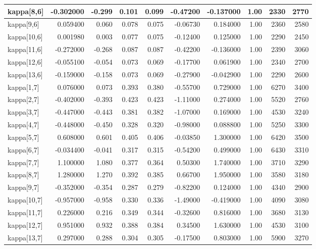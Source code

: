 \documentclass[
]{article}
\begin{document}
\begin{longtable*}[t]{l|r|r|r|r|r|r|r|r|r}
\hline
kappa[8,6] & -0.302000 & -0.299 & 0.101 & 0.099 & -0.47200 & -0.137000 & 1.00 & 2330 & 2770\\
\hline
kappa[9,6] & 0.059400 & 0.060 & 0.078 & 0.075 & -0.06730 & 0.184000 & 1.00 & 2360 & 2580\\
\hline
kappa[10,6] & 0.001980 & 0.003 & 0.077 & 0.075 & -0.12400 & 0.125000 & 1.00 & 2290 & 2450\\
\hline
kappa[11,6] & -0.272000 & -0.268 & 0.087 & 0.087 & -0.42200 & -0.136000 & 1.00 & 2390 & 3060\\
\hline
kappa[12,6] & -0.055100 & -0.054 & 0.073 & 0.069 & -0.17700 & 0.061900 & 1.00 & 2340 & 2700\\
\hline
kappa[13,6] & -0.159000 & -0.158 & 0.073 & 0.069 & -0.27900 & -0.042900 & 1.00 & 2290 & 2600\\
\hline
kappa[1,7] & 0.076000 & 0.073 & 0.393 & 0.380 & -0.55700 & 0.729000 & 1.00 & 6270 & 3400\\
\hline
kappa[2,7] & -0.402000 & -0.393 & 0.423 & 0.423 & -1.11000 & 0.274000 & 1.00 & 5520 & 2760\\
\hline
kappa[3,7] & -0.447000 & -0.443 & 0.381 & 0.382 & -1.07000 & 0.169000 & 1.00 & 4530 & 3240\\
\hline
kappa[4,7] & -0.448000 & -0.450 & 0.328 & 0.320 & -0.98000 & 0.088800 & 1.00 & 5250 & 3300\\
\hline
kappa[5,7] & 0.608000 & 0.601 & 0.405 & 0.406 & -0.03850 & 1.300000 & 1.00 & 6420 & 3500\\
\hline
kappa[6,7] & -0.034400 & -0.041 & 0.317 & 0.315 & -0.54200 & 0.499000 & 1.00 & 6430 & 3310\\
\hline
kappa[7,7] & 1.100000 & 1.080 & 0.377 & 0.364 & 0.50300 & 1.740000 & 1.00 & 3710 & 3290\\
\hline
kappa[8,7] & 1.280000 & 1.270 & 0.392 & 0.385 & 0.66700 & 1.950000 & 1.00 & 3580 & 3180\\
\hline
kappa[9,7] & -0.352000 & -0.354 & 0.287 & 0.279 & -0.82200 & 0.124000 & 1.00 & 4340 & 2900\\
\hline
kappa[10,7] & -0.957000 & -0.958 & 0.330 & 0.336 & -1.49000 & -0.419000 & 1.00 & 4090 & 3080\\
\hline
kappa[11,7] & 0.226000 & 0.216 & 0.349 & 0.344 & -0.32600 & 0.816000 & 1.00 & 3680 & 3130\\
\hline
kappa[12,7] & 0.951000 & 0.932 & 0.388 & 0.384 & 0.34500 & 1.630000 & 1.00 & 4530 & 3100\\
\hline
kappa[13,7] & 0.297000 & 0.288 & 0.304 & 0.305 & -0.17500 & 0.803000 & 1.00 & 5900 & 3270\\

\end{longtable*}
\end{document}
